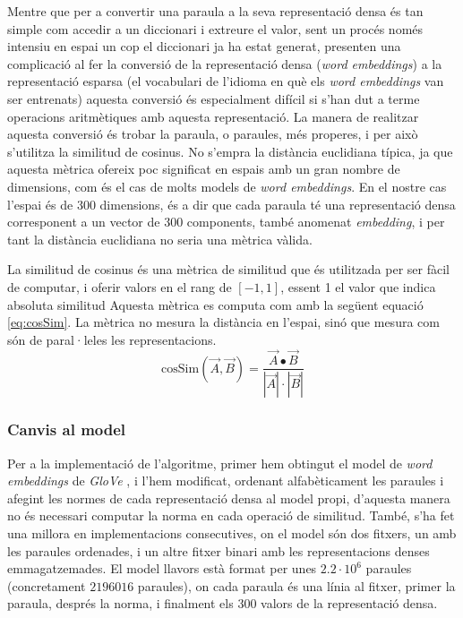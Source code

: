\documentclass[catalan,10pt,a4paper]{article}
\begin{document}
Mentre que per a convertir una paraula a la seva representació densa és tan simple com accedir a un diccionari i extreure el valor, sent un procés només intensiu en espai un cop el diccionari ja ha estat generat, presenten una complicació al fer la conversió de la representació densa (\textit{word embeddings}) a la representació esparsa (el vocabulari de l'idioma en què els \textit{word embeddings} van ser entrenats) aquesta conversió és especialment difícil si s'han dut a terme operacions aritmètiques amb aquesta representació.\newline
La manera de realitzar aquesta conversió és trobar la paraula, o paraules, més properes, i per això s'utilitza la similitud de cosinus. No s'empra la distància euclidiana típica, ja que aquesta mètrica ofereix poc significat en espais amb un gran nombre de dimensions, com és el cas de molts models de \textit{word embeddings}. En el nostre cas l'espai és de 300 dimensions, és a dir que cada paraula té una representació densa corresponent a un vector de 300 components, també anomenat \textit{embedding}, i per tant la distància euclidiana no seria una mètrica vàlida.

La similitud de cosinus \cite{Cosinesi72:online} és una mètrica de similitud que és utilitzada per ser fàcil de computar, i oferir valors en el rang de $[-1,1]$, essent 1 el valor que indica absoluta similitud Aquesta mètrica es computa com amb la següent equació \ref{eq:cosSim}. La mètrica no mesura la distància en l'espai, sinó que mesura com són de paral·leles les representacions.
\begin{equation} \label{eq:cosSim}
	\text{cosSim}(\vec A,\vec B) = \frac{\vec A\bullet \vec B}{|\vec A|\cdot|\vec B|}
\end{equation}

\subsubsection*{Canvis al model}
Per a la implementació de l'algoritme, primer hem obtingut el model de \textit{word embeddings} de \textit{GloVe} \cite{GloVeGlo18:online}, i l'hem modificat, ordenant alfabèticament les paraules i afegint les normes de cada representació densa al model propi, d'aquesta manera no és necessari computar la norma en cada operació de similitud. També, s'ha fet una millora en implementacions consecutives, on el model són dos fitxers, un amb les paraules ordenades, i un altre fitxer binari amb les representacions denses emmagatzemades. El model llavors està format per unes $2.2\cdot 10^{6}$ paraules (concretament $2196016$ paraules), on cada paraula és una línia al fitxer, primer la paraula, després la norma, i finalment els 300 valors de la representació densa.	
\end{document}
